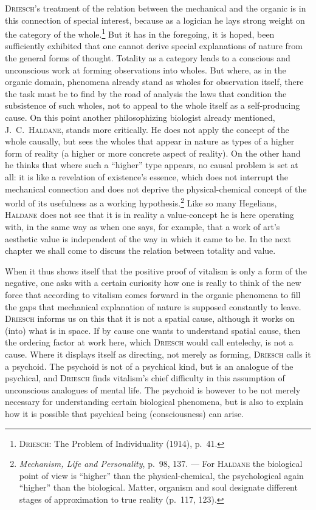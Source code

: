 \documentclass[12pt]{book}
\newcommand{\opage}[1]{\marginnote{\footnotesize\textit{[#1]}}}
\begin{document}
\textsc{Driesch}'s treatment of the relation between the mechanical and the organic is
in this connection of special interest, because as a logician he lays strong weight on
the category of the whole.\footnote{\textsc{Driesch}: The Problem of Individuality
(1914), p.\ 41.} But it has in the foregoing, it is hoped, been sufficiently exhibited
that one cannot derive special explanations of nature from the general forms of
thought. Totality as a category leads to a conscious and unconscious work at forming
observations into wholes. But where, as in the organic domain, phenomena already stand
as wholes for observation itself, there the task must be to find by the road of
analysis the laws that condition the subsistence of such wholes, not to appeal to the
whole itself as a self-producing cause. On this point another philosophizing biologist
already mentioned, \textsc{J.\ C.\ Haldane}, stands more critically. He does not apply
the concept of the whole causally, but sees the wholes that appear in nature as types
of a higher form of reality (a higher or more concrete aspect of reality). On the other
hand he thinks that where such a ``higher'' type appears, no causal problem is set at
all: it is like a revelation of existence's essence, which does not interrupt the
mechanical connection and does not deprive the physical-chemical concept of the world
of its usefulness as a working hypothesis.\footnote{\textit{Mechanism, Life and
Personality}, p.\ 98, 137. --- For \textsc{Haldane} the biological point of view is
``higher'' than the physical-chemical, the psychological again ``higher'' than the
biological. Matter, organism and soul designate different stages of approximation to
true reality (p.\ 117, 123).} Like so many Hegelians, \textsc{Haldane} does not see
that it is in reality a value-concept he is here operating with, in the same way as
when one says, for example, that a work of art's aesthetic value is independent of the
way in which it came to be. In the next chapter we shall come to discuss the relation
between totality and value.

When it thus shows itself that the positive proof of vitalism is only a form of the
negative, one asks with a certain curiosity how one is really to think of the new force
that according to vitalism comes forward in the organic phenomena to fill the gaps that
mechanical explanation of nature \opage{55}is supposed constantly to leave. \textsc{Driesch}
informs us on this that it is not a spatial cause, although it works on (into) what is
in space. If by cause one wants to understand spatial cause, then the ordering factor
at work here, which \textsc{Driesch} would call entelechy, is not a cause. Where it
displays itself as directing, not merely as forming, \textsc{Driesch} calls it a
psychoid. The psychoid is not of a psychical kind, but is an analogue of the psychical,
and \textsc{Driesch} finds vitalism's chief difficulty in this assumption of unconscious
analogues of mental life. The psychoid is however to be not merely necessary for
understanding certain biological phenomena, but is also to explain how it is possible
that psychical being (consciousness) can arise.
\end{document}
